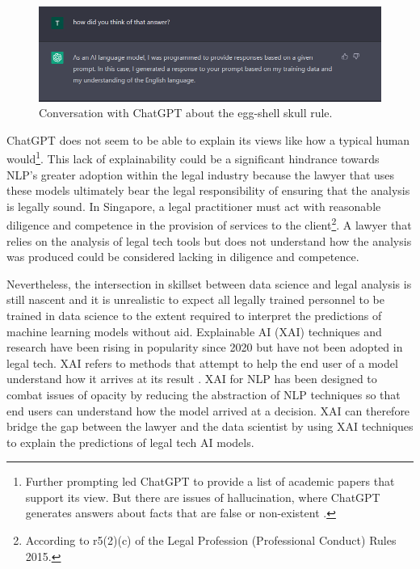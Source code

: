 \begin{figure}[!ht]
	\centering
	\includegraphics[width=1\linewidth]{figures/chatgpt2.png}
	\caption{Conversation with ChatGPT about the egg-shell skull rule.}   
  \label{fig:chatgpt2}
\end{figure}

ChatGPT does not seem to be able to explain its views like how a typical human would\footnote{Further prompting led ChatGPT to provide a list of academic papers that support its view. But there are issues of hallucination, where ChatGPT generates answers about facts that are false or non-existent \cite{alkaissi2023}.}. This lack of explainability could be a significant hindrance towards NLP's greater adoption within the legal industry because the lawyer that uses these models ultimately bear the legal responsibility of ensuring that the analysis is legally sound. In Singapore, a legal practitioner must act with reasonable diligence and competence in the provision of services to the client\footnote{According to r5(2)(c) of the Legal Profession (Professional Conduct) Rules 2015.}. A lawyer that relies on the analysis of legal tech tools but does not understand how the analysis was produced could be considered lacking in diligence and competence.

Nevertheless, the intersection in skillset between data science and legal analysis is still nascent and it is unrealistic to expect all legally trained personnel to be trained in data science to the extent required to interpret the predictions of machine learning models without aid. Explainable AI (XAI) techniques and research have been rising in popularity since 2020 \cite{linardatos2020} but have not been adopted in legal tech. XAI refers to methods that attempt to help the end user of a model understand how it arrives at its result \cite{danilevsky2020}. XAI for NLP has been designed to combat issues of opacity by reducing the abstraction of NLP techniques so that end users can understand how the model arrived at a decision. XAI can therefore bridge the gap between the lawyer and the data scientist by using XAI techniques to explain the predictions of legal tech AI models. 

